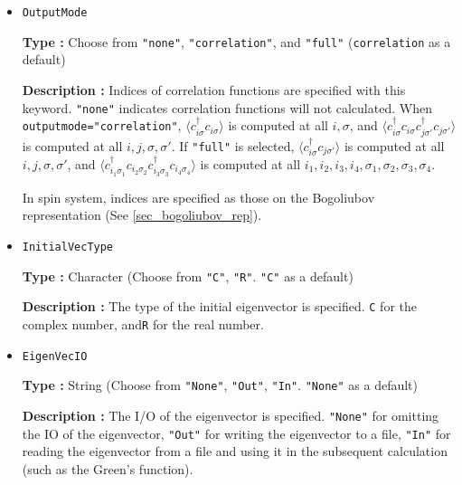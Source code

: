 \begin{itemize}
{\bf Type :} Positive integer (\verb|20| as a default)

{\bf Description :} (Only for the TPQ) 
We specify the interval steps of calculating correlation functions in TPQ method.\\ 
{\bf Note:} The small interval increases the time cost of calculations.

\item \verb|OutputMode|

{\bf Type :} Choose from \verb|"none"|, \verb|"correlation"|, and \verb|"full"|
(\verb|correlation| as a default)

{\bf Description :} Indices of correlation functions
are specified with this keyword.
\verb|"none"| indicates correlation functions will not calculated.
When \verb|outputmode="correlation"|,
$\langle c_{i \sigma}^{\dagger}c_{i \sigma} \rangle$ is computed at all $i, \sigma$,
and
$\langle c_{i \sigma}^{\dagger}c_{i \sigma} c_{j \sigma'}^{\dagger}c_{j \sigma'} \rangle$
is computed at all $i, j, \sigma, \sigma'$.
If \verb|"full"| is selected,
$\langle c_{i \sigma}^{\dagger}c_{j \sigma'} \rangle$ is computed at all $i, j, \sigma, \sigma'$,
and
$\langle c_{i_1 \sigma_1}^{\dagger}c_{i_2 \sigma_2} c_{i_3 \sigma_3}^{\dagger}c_{i_4 \sigma_4} \rangle$
is computed at all $i_1, i_2, i_3, i_4, \sigma_1, \sigma_2, \sigma_3, \sigma_4$.

In spin system, 
indices are specified as those on the Bogoliubov representation
(See \ref{sec_bogoliubov_rep}).

\item \verb|InitialVecType|

  {\bf Type :} Character (Choose from \verb|"C"|, \verb|"R"|.
  \verb|"C"| as a default)

  {\bf Description :} The type of the initial eigenvector is specified.
  \verb|C| for the complex number, and\verb|R| for the real number.

\item \verb|EigenVecIO|
  
  {\bf Type :} String (Choose from \verb|"None"|, \verb|"Out"|, \verb|"In"|.
  \verb|"None"| as a default)

  {\bf Description :} The I/O of the eigenvector is specified.
  \verb|"None"| for omitting the IO of the eigenvector,
  \verb|"Out"| for writing the eigenvector to a file,
  \verb|"In"| for reading the eigenvector from a file and
  using it in the subsequent calculation (such as the Green's function).

\end{itemize}

